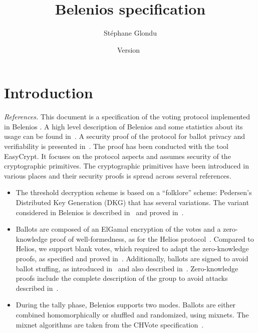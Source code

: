 \documentclass[a4paper]{article}
\title{Belenios specification}
\date{Version~\version}
\author{Stéphane Glondu}
\newcommand{\version}{}
\begin{document}
\maketitle
\tableofcontents

\section{Introduction}
{\it References.}
This document is a specification of the voting protocol implemented in
Belenios \version.
A high level description of Belenios and some statistics about its
usage can be found in~\cite{Belenios-Meadows2019}.
A security proof of the protocol for ballot privacy and verifiability
is presented in~\cite{Belenios-Easycrypt-CSF18}. The proof has been conducted with the
tool EasyCrypt. It focuses on the protocol aspects and assumes
security of the cryptographic primitives.
The cryptographic primitives have been introduced in various places
and their security proofs is spread across several references.
\begin{itemize}
\item
The threshold decryption scheme is
based on a ``folklore'' scheme:
Pedersen’s~\cite{Pedersen} Distributed Key Generation (DKG) that has several variations.
The variant considered in Belenios is described in~\cite{wpes2013} and
proved in~\cite{wpes2013,asiacrypt12}.
\item Ballots are composed of an ElGamal encryption of the votes and a
  zero-knowledge proof of well-formedness, as for the Helios
  protocol~\cite{Helios}. Compared to Helios, we support blank votes,
  which required to adapt the zero-knowledge proofs, as specified and
  proved in~\cite{note-Pierrick}. Additionally, ballots are signed to
  avoid ballot stuffing, as introduced in~\cite{CGGI-esorics14} and also
  described in~\cite{Belenios-Meadows2019}.
  Zero-knowledge proofs include the complete description of the group
  to avoid attacks described in~\cite{EVoteID20-Belenios}.
  \item During the tally phase, Belenios supports two modes. Ballots are either combined
    homomorphically or shuffled and randomized, using mixnets. The
    mixnet algorithms are taken from the CHVote specification~\cite{CHVote}.
\end{itemize}

\end{document}
